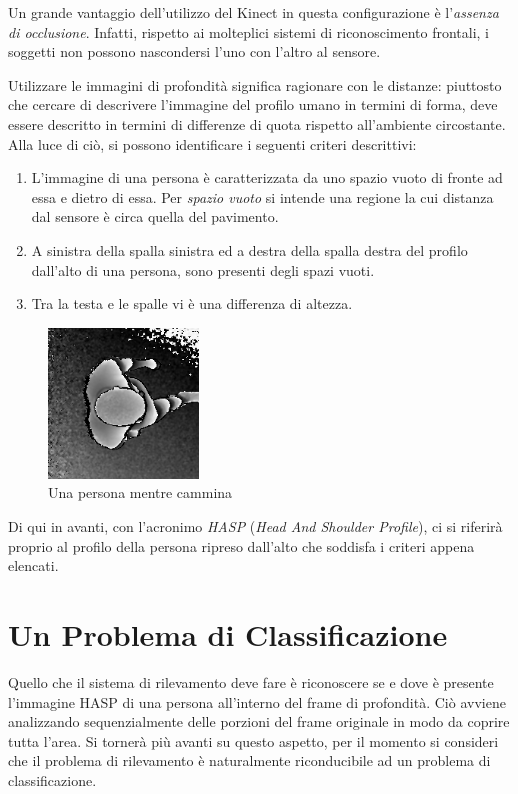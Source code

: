 Un grande vantaggio dell'utilizzo del Kinect in questa configurazione è l'\emph{assenza di occlusione}.
Infatti, rispetto ai molteplici sistemi di riconoscimento frontali, i soggetti non possono nascondersi l'uno con l'altro al sensore.

Utilizzare le immagini di profondità significa ragionare con le distanze: piuttosto che cercare di descrivere l'immagine del profilo umano in termini di forma, deve essere descritto in termini di differenze di quota rispetto all'ambiente circostante.
Alla luce di ciò, si possono identificare i seguenti criteri descrittivi:

\begin{enumerate}
    \item L'immagine di una persona è caratterizzata da uno spazio vuoto di fronte ad essa e dietro di essa. Per \emph{spazio vuoto} si intende una regione la cui distanza dal sensore è circa quella del pavimento.
    \item A sinistra della spalla sinistra ed a destra della spalla destra del profilo dall'alto di una persona, sono presenti degli spazi vuoti.
    \item Tra la testa e le spalle vi è una differenza di altezza.

\end{enumerate}

\begin{figure}
    \centering
    \includegraphics[width=4cm]{img/spatial_features.png}
    \caption{Una persona mentre cammina}
    \label{fig:spatial_feature}
\end{figure}

Di qui in avanti, con l'acronimo \emph{HASP} (\emph{Head And Shoulder Profile}), ci si riferirà proprio al profilo della persona ripreso dall'alto che soddisfa i criteri appena elencati.


\section{Un Problema di Classificazione}
\label{sec:classification_problem}
Quello che il sistema di rilevamento deve fare è riconoscere se e dove è presente l'immagine HASP di una persona all'interno del frame di profondità.
Ciò avviene analizzando sequenzialmente delle porzioni del frame originale in modo da coprire tutta l'area. Si tornerà più avanti su questo aspetto, per il momento si consideri che il problema di rilevamento è naturalmente riconducibile ad un problema di classificazione.

